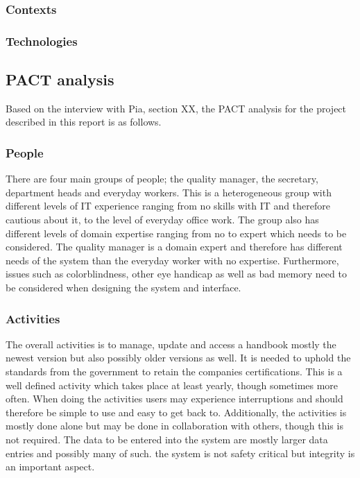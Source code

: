 \subsubsection*{Contexts}

\subsubsection*{Technologies}


\subsection{PACT analysis}\label{sec:PACT-analysis}
Based on the interview
with Pia,
{\color{red} section XX}, the PACT analysis for the project described in this report is as follows.

\subsubsection*{People}

There are four main groups of people; the quality manager, the secretary, department heads and everyday workers.
This is a heterogeneous group with different levels of IT experience ranging from no skills with IT and therefore cautious about it, to the level of everyday office work.
The group also has different levels of domain expertise ranging from no to expert which needs to be considered. The quality manager is a domain expert and therefore has different needs of the system than the everyday worker with no expertise.
\newline
Furthermore, issues such as colorblindness, other eye handicap as well as bad memory need to be considered when designing the system and interface.


\subsubsection*{Activities}
The overall activities is to manage, update and access a handbook mostly the newest version but also possibly older versions as well. It is needed to uphold the standards from the government to retain the companies certifications.
This is a well defined activity
which takes place at least yearly, though sometimes more often.
When doing the activities users may experience interruptions and should therefore be simple to use and easy to get back to.
Additionally, the activities is mostly done alone but may be done in collaboration with others, though this is not required.
\newline
The data to be entered into the system are mostly larger data entries and possibly many of such.
the system is not safety critical but integrity is an important aspect.

